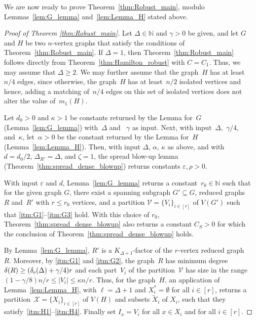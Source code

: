 \documentclass[final]{article}
\theoremstyle{definition}
\newcommand{\eps}{\varepsilon}
\newcommand{\exth}{\delta_{\rm e}(\Delta)}
\let\tilde\widetilde
\begin{document}
We are now ready to prove Theorem~\ref{thm:Robust_main}, modulo Lemmas~\ref{lem:G_lemma} and~\ref{lem:Lemma_H} stated above.

\begin{proof}[Proof of Theorem \ref{thm:Robust_main}]
    Let $\Delta \in \mathbb{N}$ and $\gamma > 0$ be given, and let $G$ and $H$ be two $n$-vertex graphs that satisfy the conditions of Theorem~\ref{thm:Robust_main}. If $\Delta = 1$, then Theorem~\ref{thm:Robust_main} follows directly from Theorem~\ref{thm:Hamilton_robust} with $C = C_1$. Thus, we may assume that $\Delta \geq 2$. We may further assume that the graph~$H$ has at least~$n/4$ edges, since otherwise, the graph~$H$ has at least~$n/2$ isolated vertices and hence, adding a matching of~$n/4$ edges on this set of isolated vertices does not alter the value of~$m_1(H)$.    
    
    Let $d_0 > 0$ and $\kappa >1$ be constants returned by the Lemma for~$G$ (Lemma~\ref{lem:G_lemma}) with~$\Delta$ and ~$\gamma$ as input. 
    Next, with input~$\Delta$,~$\gamma/4$, and~$\kappa$, let~$\alpha > 0$ be the constant returned by the Lemma for~$H$ (Lemma~\ref{lem:Lemma_H}). 
    Then, with input $\Delta$, $\alpha$, $\kappa$ as above, and with $d = d_0/2$, $\Delta_{R'} = \Delta$, and $\zeta = 1$, the spread blow-up lemma (Theorem~\ref{thm:spread_dense_blowup}) returns constants $\eps, \rho > 0$. 
    
    With input $\eps$ and $d$, Lemma~\ref{lem:G_lemma} returns a constant~$r_0 \in \mathbb{N}$ such that for the given graph $G$, there exist a spanning subgraph $G' \subseteq G$, reduced graphs~$R$ and~$R'$ with $r \leq r_0$ vertices, and a partition $\mathcal{V} = \{V_i\}_{i \in [r]}$ of $V(G')$ such that \ref{itm:G1}--\ref{itm:G3} hold. With this choice of $r_0$, Theorem~\ref{thm:spread_dense_blowup} also returns a constant $C_S > 0$ for which the conclusion of Theorem~\ref{thm:spread_dense_blowup} holds.
    
    By Lemma~\ref{lem:G_lemma}, $R'$ is a  $K_{\Delta+1}$-factor of the $r$-vertex reduced graph~$R$. Moreover, by \ref{itm:G1} and \ref{itm:G2}, the graph~$R$ has minimum degree $\delta(R) \geq (\exth+\gamma/4)r$ and each part~$V_i$ of the partition~$\mathcal{V}$ has size in the range $(1 - \gamma/8)n/r \leq |V_i| \leq \kappa n/r$. 
    Thus, for the graph~$H$, an application of Lemma~\ref{lem:Lemma_H}, with $\ell = \Delta+1$ and $X_i^* = \emptyset$ for all $i \in [r]$, returns a partition~$\mathcal{X} = \{X_i\}_{i\in [r]}$ of $V(H)$ and subsets $\tilde{X}_i$ of $X_i$, such that they satisfy~\ref{itm:H1}--\ref{itm:H4}. Finally set $I_x = V_i$ for all $x\in X_i$ and for all $i \in [r]$.  


\end{proof}
\end{document}
